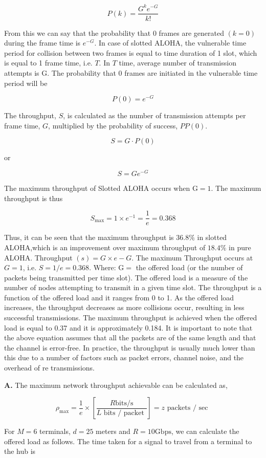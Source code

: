 \documentclass[main.tex]{subfiles}
\begin{document}
\begin{enumerate}
$$
P(k)=\frac{G^k e^{-G}}{k !}
$$

From this we can say that the probability that 0 frames are generated $(k=0)$ during the frame time is $e^{-G}$. In case of slotted ALOHA, the vulnerable time period for collision between two frames is equal to time duration of 1 slot, which is equal to 1 frame time, i.e. $T$. In $T$ time, average number of transmission attempts is $\mathrm{G}$. The probability that 0 frames are initiated in the vulnerable time period will be

$$
P(0)=e^{-G}
$$

The throughput, $S$, is calculated as the number of transmission attempts per frame time, $G$, multiplied by the probability of success, $P P(0)$.

$$
S=G \cdot P(0)
$$

or

$$
S=G e^{-G}
$$

The maximum throughput of Slotted ALOHA occurs when $\mathrm{G}=1$. The maximum throughput is thus

$$
S_{\max }=1 \times e^{-1}=\frac{1}{e}=0.368
$$

Thus, it can be seen that the maximum throughput is $36.8 \%$ in slotted ALOHA,which is an improvement over maximum throughput of $18.4 \%$ in pure ALOHA. Throughput $(s)=G \times e-G$. The maximum Throughput occurs at $G=1$, i.e. $S=1 / e=0.368$. Where: $\mathrm{G}=$ the offered load (or the number of packets being transmitted per time slot). The offered load is a measure of the number of nodes attempting to transmit in a given time slot. The throughput is a function of the offered load and it ranges from 0 to 1. As the offered load increases, the throughput decreases as more collisions occur, resulting in less successful transmissions. The maximum throughput is achieved when the offered load is equal to 0.37 and it is approximately 0.184. It is important to note that the above equation assumes that all the packets are of the same length and that the channel is error-free. In practice, the throughput is usually much lower than this due to a number of factors such as packet errors, channel noise, and the overhead of re transmissions.

\textbf{A.} The maximum network throughput achievable can be calculated as,

$$
\rho_{\max }=\frac{1}{e} \times\left[\frac{R \mathrm{bits} / \mathrm{s}}{L \text { bits } / \text { packet }}\right]=z \text { packets } / \text { sec }
$$

For $M=6$ terminals, $d=25$ meters and $R=10 \mathrm{Gbps}$, we can calculate the offered load as follows. The time taken for a signal to travel from a terminal to the hub is 


\end{enumerate}
\end{document}
